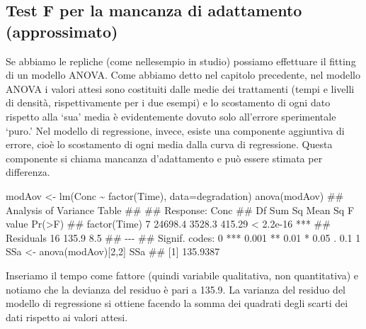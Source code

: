 \documentclass[a4paper,12pt,oneside]{book}
\newenvironment{Shaded}{\begin{snugshade}}{\end{snugshade}}
\newcommand{\DecValTok}[1]{#1}
\newcommand{\SpecialCharTok}[1]{#1}
\newcommand{\DocumentationTok}[1]{#1}
\newcommand{\OtherTok}[1]{#1}
\newcommand{\FunctionTok}[1]{#1}
\newcommand{\AttributeTok}[1]{#1}
\newcommand{\NormalTok}[1]{#1}
\begin{document}
\hypertarget{test-f-per-la-mancanza-di-adattamento-approssimato}{%
\subsection{Test F per la mancanza di adattamento (approssimato)}\label{test-f-per-la-mancanza-di-adattamento-approssimato}}

Se abbiamo le repliche (come nellesempio in studio) possiamo effettuare il fitting di un modello ANOVA. Come abbiamo detto nel capitolo precedente, nel modello ANOVA i valori attesi sono costituiti dalle medie dei trattamenti (tempi e livelli di densità, rispettivamente per i due esempi) e lo scostamento di ogni dato rispetto alla `sua' media è evidentemente dovuto solo all'errore sperimentale `puro.' Nel modello di regressione, invece, esiste una componente aggiuntiva di errore, cioè lo scostamento di ogni media dalla curva di regressione. Questa componente si chiama mancanza d'adattamento e può essere stimata per differenza.

\begin{Shaded}
\begin{Highlighting}[]
\NormalTok{modAov }\OtherTok{\textless{}{-}} \FunctionTok{lm}\NormalTok{(Conc }\SpecialCharTok{\textasciitilde{}} \FunctionTok{factor}\NormalTok{(Time), }\AttributeTok{data=}\NormalTok{degradation)}
\FunctionTok{anova}\NormalTok{(modAov)}
\DocumentationTok{\#\# Analysis of Variance Table}
\DocumentationTok{\#\# }
\DocumentationTok{\#\# Response: Conc}
\DocumentationTok{\#\#              Df  Sum Sq Mean Sq F value    Pr(\textgreater{}F)    }
\DocumentationTok{\#\# factor(Time)  7 24698.4  3528.3  415.29 \textless{} 2.2e{-}16 ***}
\DocumentationTok{\#\# Residuals    16   135.9     8.5                      }
\DocumentationTok{\#\# {-}{-}{-}}
\DocumentationTok{\#\# Signif. codes:  0 \textquotesingle{}***\textquotesingle{} 0.001 \textquotesingle{}**\textquotesingle{} 0.01 \textquotesingle{}*\textquotesingle{} 0.05 \textquotesingle{}.\textquotesingle{} 0.1 \textquotesingle{} \textquotesingle{} 1}
\NormalTok{SSa }\OtherTok{\textless{}{-}} \FunctionTok{anova}\NormalTok{(modAov)[}\DecValTok{2}\NormalTok{,}\DecValTok{2}\NormalTok{]}
\NormalTok{SSa}
\DocumentationTok{\#\# [1] 135.9387}
\end{Highlighting}
\end{Shaded}

Inseriamo il tempo come fattore (quindi variabile qualitativa, non quantitativa) e notiamo che la devianza del residuo è pari a 135.9. La varianza del residuo del modello di regressione si ottiene facendo la somma dei quadrati degli scarti dei dati rispetto ai valori attesi.
\end{document}
